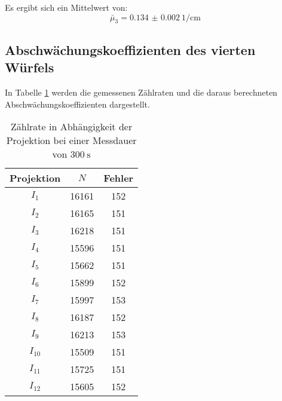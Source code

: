 Es ergibt sich ein Mittelwert von:
\begin{equation*}
  \bar\mu_3 = \SI{0.134(2)}{1\per\centi\meter}
\end{equation*}


\subsection{Abschwächungskoeffizienten des vierten Würfels}
In Tabelle \ref{tab:mu} werden die gemessenen Zählraten und
die daraus berechneten Abschwächungskoeffizienten dargestellt.

\begin{table}[H]
  \centering
  \caption{Zählrate in Abhängigkeit der Projektion bei einer Messdauer von $\SI{300}{\second}$}
  \label{tab:mu}
  \begin{tabular}{c c c}
    \toprule
    Projektion & $N$ & Fehler   \\
    \midrule
        $I_1$    & 16161 & 152    \\
        $I_2$    & 16165 & 151    \\
        $I_3$    & 16218 & 151    \\
        $I_4$    & 15596 & 151    \\
        $I_5$    & 15662 & 151    \\
        $I_6$    & 15899 & 152    \\
        $I_7$    & 15997 & 153    \\
        $I_8$    & 16187 & 152    \\
        $I_9$    & 16213 & 153    \\
        $I_{10}$ & 15509 & 151   \\
        $I_{11}$ & 15725 & 151    \\
        $I_{12}$ & 15605 & 152    \\
    \bottomrule
  \end{tabular}
\end{table}

